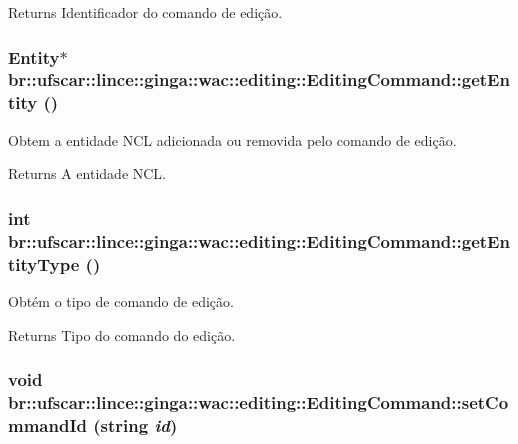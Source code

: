 \begin{DoxyReturn}{Returns}
Identificador do comando de edição. 
\end{DoxyReturn}
\hypertarget{classbr_1_1ufscar_1_1lince_1_1ginga_1_1wac_1_1editing_1_1EditingCommand_a38477c48ab9f7b0cb7ca2fe6cf8b8ca7}{
\subsubsection[{getEntity}]{\setlength{\rightskip}{0pt plus 5cm}Entity$\ast$ br::ufscar::lince::ginga::wac::editing::EditingCommand::getEntity ()}}
\label{classbr_1_1ufscar_1_1lince_1_1ginga_1_1wac_1_1editing_1_1EditingCommand_a38477c48ab9f7b0cb7ca2fe6cf8b8ca7}


Obtem a entidade NCL adicionada ou removida pelo comando de edição. 

\begin{DoxyReturn}{Returns}
A entidade NCL. 
\end{DoxyReturn}
\hypertarget{classbr_1_1ufscar_1_1lince_1_1ginga_1_1wac_1_1editing_1_1EditingCommand_aaf9cd154148d3c9022e9aefe21fb1ff9}{
\subsubsection[{getEntityType}]{\setlength{\rightskip}{0pt plus 5cm}int br::ufscar::lince::ginga::wac::editing::EditingCommand::getEntityType ()}}
\label{classbr_1_1ufscar_1_1lince_1_1ginga_1_1wac_1_1editing_1_1EditingCommand_aaf9cd154148d3c9022e9aefe21fb1ff9}


Obtém o tipo de comando de edição. 

\begin{DoxyReturn}{Returns}
Tipo do comando do edição. 
\end{DoxyReturn}
\hypertarget{classbr_1_1ufscar_1_1lince_1_1ginga_1_1wac_1_1editing_1_1EditingCommand_aee78eb520e1901f64e526034bcf0ad6c}{
\subsubsection[{setCommandId}]{\setlength{\rightskip}{0pt plus 5cm}void br::ufscar::lince::ginga::wac::editing::EditingCommand::setCommandId (string {\em id})}}
\label{classbr_1_1ufscar_1_1lince_1_1ginga_1_1wac_1_1editing_1_1EditingCommand_aee78eb520e1901f64e526034bcf0ad6c}


